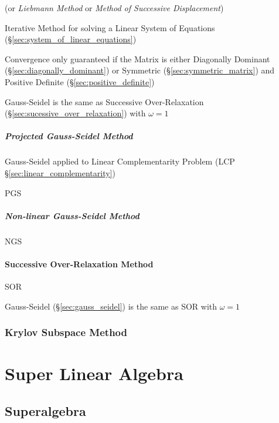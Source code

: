 (or \emph{Liebmann Method} or \emph{Method of Successive
  Displacement})

Iterative Method for solving a Linear System of Equations
(\S\ref{sec:system_of_linear_equations})

Convergence only guaranteed if the Matrix is either Diagonally
Dominant (\S\ref{sec:diagonally_dominant}) or Symmetric
(\S\ref{sec:symmetric_matrix}) and Positive Definite
(\S\ref{sec:positive_definite})

Gauss-Seidel is the same as Successive Over-Relaxation
(\S\ref{sec:sucessive_over_relaxation}) with $\omega = 1$



\subparagraph{Projected Gauss-Seidel Method}\hfill
\label{sec:projected_gauss_seidel}

Gauss-Seidel applied to Linear Complementarity Problem (LCP
\S\ref{sec:linear_complementarity})

PGS



\subparagraph{Non-linear Gauss-Seidel Method}
\label{sec:nonlinear_gauss_seidel}

NGS



\paragraph{Successive Over-Relaxation Method}
\label{sec:successive_over_relaxation}\hfill

SOR

Gauss-Seidel (\S\ref{sec:gauss_seidel}) is the same as SOR with $\omega = 1$



\subsubsection{Krylov Subspace Method}\label{sec:krylov_subspace_method}



\section{Super Linear Algebra}\label{sec:super_linear_algebra}

\subsection{Superalgebra}\label{sec:superalgebra}

